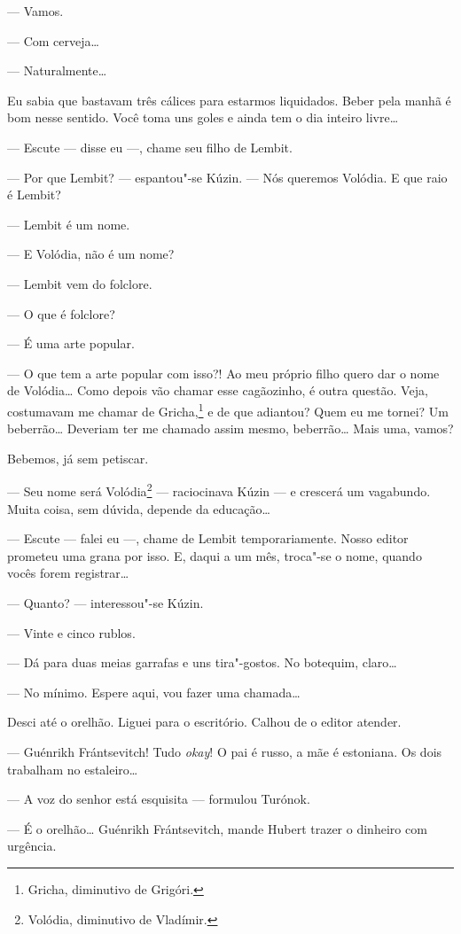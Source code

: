 --- Vamos.

--- Com cerveja\ldots{}

--- Naturalmente\ldots{}

Eu sabia que bastavam três cálices para estarmos liquidados. Beber pela
manhã é bom nesse sentido. Você toma uns goles e ainda tem o dia inteiro
livre\ldots{}

--- Escute --- disse eu ---, chame seu filho de Lembit.

--- Por que Lembit? --- espantou"-se Kúzin. --- Nós queremos Volódia. E
que raio é Lembit?

--- Lembit é um nome.

--- E Volódia, não é um nome?

--- Lembit vem do folclore.

--- O que é folclore?

--- É uma arte popular.

--- O que tem a arte popular com isso?! Ao meu próprio filho quero dar o
nome de Volódia\ldots{} Como depois vão chamar esse cagãozinho, é outra
questão. Veja, costumavam me chamar de Gricha,\footnote{Gricha,
  diminutivo de Grigóri.} e de que adiantou? Quem eu me tornei? Um
beberrão\ldots{} Deveriam ter me chamado assim mesmo, beberrão\ldots{} Mais uma,
vamos?

Bebemos, já sem petiscar.

--- Seu nome será Volódia\footnote{Volódia, diminutivo de Vladímir.} ---
raciocinava Kúzin --- e crescerá um vagabundo. Muita coisa, sem dúvida,
depende da educação\ldots{}

--- Escute --- falei eu ---, chame de Lembit temporariamente. Nosso
editor prometeu uma grana por isso. E, daqui a um mês, troca"-se o nome,
quando vocês forem registrar\ldots{}

--- Quanto? --- interessou"-se Kúzin.

--- Vinte e cinco rublos.

--- Dá para duas meias garrafas e uns tira"-gostos. No botequim, claro\ldots{}

--- No mínimo. Espere aqui, vou fazer uma chamada\ldots{}

Desci até o orelhão. Liguei para o escritório. Calhou de o editor
atender.

--- Guénrikh Frántsevitch! Tudo \emph{okay}! O pai é russo, a mãe é
estoniana. Os dois trabalham no estaleiro\ldots{}

--- A voz do senhor está esquisita --- formulou Turónok.

--- É o orelhão\ldots{} Guénrikh Frántsevitch, mande Hubert trazer o dinheiro
com urgência.

